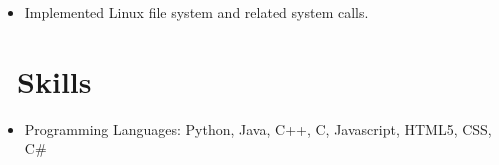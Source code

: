 \documentclass[letterpaper]{resume}
\begin{document}
\begin{itemize}
  \item Implemented Linux file system and related system calls.
\end{itemize}


\section{\faCogs\ Skills}
\begin{itemize}[parsep=0.5ex]
  \item Programming Languages: Python, Java, C++, C, Javascript, HTML5, CSS, C\#
\end{itemize}



%
%
\end{document}
